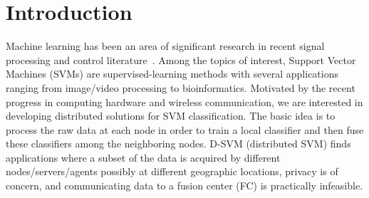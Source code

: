 \documentclass[letterpaper, 10pt, conference]{ieeeconf}
\begin{document}
\section{Introduction} \label{sec_intro}
Machine learning has been an area of significant research in recent signal processing and control literature~\cite{xin2020decentralized,xin2020general,giannakis2020time,TCNS_resource}. Among the topics of interest, Support Vector Machines (SVMs) are supervised-learning methods with several applications ranging from image/video processing to bioinformatics. Motivated by the recent progress in computing hardware and wireless communication, we are interested in developing distributed solutions for SVM classification. The basic idea is to process the raw data at each node in order to train a local classifier and then fuse these classifiers among the neighboring nodes. D-SVM (distributed SVM) finds applications where a subset of the data is acquired by different nodes/servers/agents possibly at different geographic locations, privacy is of concern, and communicating data to a fusion center (FC) is practically infeasible.
\end{document}
